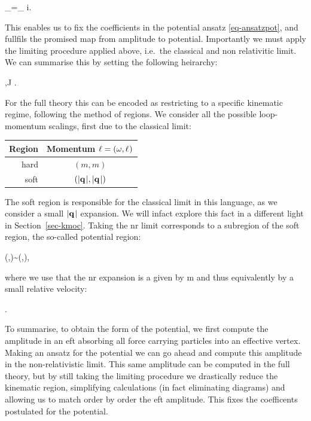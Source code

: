 \documentclass[
  10pt,
  a4paper,
  DIV=11,
  numbers=noendperiod,
  oneside]{scrreprt}
\let\[\relax \let\]\relax %
\DeclareRobustCommand{\[}{\begin{equation}}
\DeclareRobustCommand{\]}{\end{equation}}
\begin{document}
\[
\ampl[(i)]_=\ampl[(i)]_ \quad \forall i.
\]

This enables us to fix the coefficients in the potential ansatz
\ref{eq-ansatzpot}, and fullfils the promised map from amplitude to
potential. Importantly we must apply the limiting procedure applied
above, i.e.~the classical and non relativitic limit. We can summarise
this by setting the following heirarchy:

\[
\mass[1],\mass[2]\ll J  \ll {}.
\]

For the full theory this can be encoded as restricting to a specific
kinematic regime, following the method of regions. We consider all the
possible loop-momentum scalings, first due to the classical limit:

\begin{longtable}[]{@{}rc@{}}
\toprule()
Region & Momentum \(\ell = (\omega,\mathbf{{\ell}}_{})\) \\
\midrule()
\endhead
hard & \((m,m)\) \\
soft & \((\vert\mathbf{{q_{}}}_{} \vert,\vert\mathbf{{q_{}}}_{} \vert)\) \\
\bottomrule()
\end{longtable}

The soft region is responsible for the classical limit in this language,
as we consider a small \(\vert\mathbf{{q_{}}}_{} \vert\) expansion. We will infact
explore this fact in a different light in Section~\ref{sec-kmoc}. Taking
the \gls{nr} limit corresponds to a subregion of the soft region, the
so-called potential region:

\[ (\omega,\tv{\ell})\sim (\abs{\tv{\tm}},\abs{\tv{\tm}}),\]

where we use that the \gls{nr} expansion is a given by
\[\abs{\tv{\emom}}\ll m\] and thus equivalently by a small relative velocity:

\[ \abs{\tv{\vel}}.\]

To summarise, to obtain the form of the potential, we first compute the
amplitude in an \gls{eft} absorbing all force carrying particles into an
effective vertex. Making an ansatz for the potential we can go ahead and
compute this amplitude in the non-relativistic limit. This same
amplitude can be computed in the full theory, but by still taking the
limiting procedure we drastically reduce the kinematic region,
simplifying calculations (in fact eliminating diagrams) and allowing us
to match order by order the \gls{eft} amplitude. This fixes the
coefficents postulated for the potential.
\end{document}
